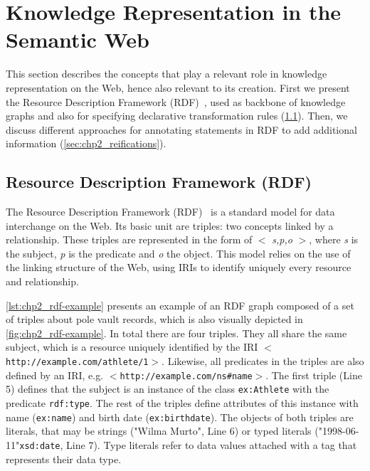 \section{Knowledge Representation in the Semantic Web}
\label{sec:chp2_semweb}

This section describes the concepts that play a relevant role in knowledge representation on the Web, hence also relevant to its creation. First we present the Resource Description Framework (RDF)~\parencite{rdf}, used as backbone of knowledge graphs and also for specifying declarative transformation rules (\cref{sec:chp2_rdf}). Then, we discuss different approaches for annotating statements in RDF to add additional information (\cref{sec:chp2_reifications}).

\subsection{Resource Description Framework (RDF)}
\label{sec:chp2_rdf}

The Resource Description Framework (RDF)~\parencite{rdf} is a standard model for data interchange on the Web. Its basic unit are triples: two concepts linked by a relationship. These triples are represented in the form of $<$ \textit{s,p,o} $>$, where \textit{s} is the subject, \textit{p} is the predicate and \textit{o} the object. This model relies on the use of the linking structure of the Web, using IRIs to identify uniquely every resource and relationship. 

\cref{lst:chp2_rdf-example} presents an example of an RDF graph composed of a set of triples about pole vault records, which is also visually depicted in \cref{fig:chp2_rdf-example}. In total there are four triples. They all share the same subject, which is a resource uniquely identified by the IRI $<$\texttt{http://example.com/athlete/1}$>$. Likewise, all predicates in the triples are also defined by an IRI, e.g. $<$\texttt{http://example.com/ns\#name}$>$. The first triple (Line 5) defines that the subject is an instance of the class \texttt{ex:Athlete} with the predicate \texttt{rdf:type}. The rest of the triples define attributes of this instance with name (\texttt{ex:name}) and birth date (\texttt{ex:birthdate}). The objects of both triples are literals, that may be strings ("Wilma Murto", Line 6) or typed literals ("1998-06-11"\scalebox{.8}{\textsuperscript{$\wedge\wedge$}}\texttt{xsd:date}, Line 7). Type literals refer to data values attached with a tag that represents their data type.

